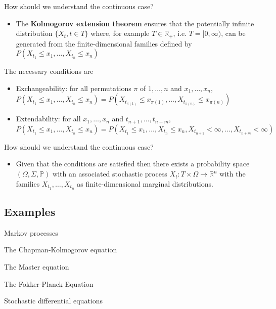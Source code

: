 \begin{frame}

How should we understand the continuous case?
\begin{itemize}
\item The \textbf{Kolmogorov extension theorem} ensures that the potentially infinite distribution $\{ X_t,t \in T \}$ where, for example $T \in \mathbb{R_+}$, i.e. $T = [0, \infty)$, can be generated from the finite-dimensional families defined by $	P(X_{t_1} \leq x_1, \ldots, X_{t_n} \leq x_n) $ \cite{Øksendal2010}
\end{itemize}
The necessary conditions are
\begin{itemize}
\item Exchangeability: for all permutations $\pi$ of $1,\ldots,n$ and $x_1,\ldots,x_n$, $P(X_{t_1} \leq x_1, \ldots, X_{t_n} \leq x_n) = P(X_{t_{\pi(1)}} \leq x_{\pi(1)}, \ldots, X_{t_{\pi(n)}} \leq x_{\pi(n)})$ 
\item Extendability: for all $x_1,\ldots,x_n$ and $t_{n+1},\ldots,t_{n+m}$, $P(X_{t_1} \leq x_1, \ldots, X_{t_n} \leq x_n) = P(X_{t_1} \leq x_1, \ldots, X_{t_n} \leq x_n, X_{t_{n+1}} < \infty, \ldots, X_{t_{n+m}} < \infty )$ 
\end{itemize}
\end{frame}

\begin{frame}
How should we understand the continuous case?
\begin{itemize}
\item Given that the conditions are satisfied then there exists a probability space $(\Omega, \Sigma, \mathbb{P})$ with an associated stochastic process $X_t : T \times \Omega \rightarrow \mathbb{R}^n$ with the families $X_{t_1}, \ldots, X_{t_n}$ as finite-dimensional marginal distributions.
\end{itemize}
\end{frame}

\subsection{Examples}
\begin{frame}
Markov processes

\end{frame}

\begin{frame}
The Chapman-Kolmogorov equation

\end{frame}

\begin{frame}
The Master equation

\end{frame}

\begin{frame}
The Fokker-Planck Equation

\end{frame}

\begin{frame}
Stochastic differential equations

\end{frame}